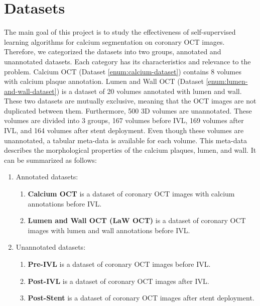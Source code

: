 \documentclass[a4paper,11pt,oneside]{report}
\begin{document}

\section{Datasets}\label{sec:design:datasets}
The main goal of this project is to study the effectiveness of self-supervised learning algorithms for calcium segmentation on coronary OCT images. Therefore, we categorized the datasets into two groups, annotated and unannotated datasets. Each category has its characteristics and relevance to the problem. Calcium OCT (Dataset \ref{enum:calcium-dataset}) contains 8 volumes with calcium plaque annotation. Lumen and Wall OCT (Dataset \ref{enum:lumen-and-wall-dataset}) is a dataset of 20 volumes annotated with lumen and wall. These two datasets are mutually exclusive, meaning that the OCT images are not duplicated between them. Furthermore, 500 3D volumes are unannotated. These volumes are divided into 3 groups, 167 volumes before IVL, 169 volumes after IVL, and 164 volumes after stent deployment. Even though these volumes are unannotated, a tabular meta-data is available for each volume. This meta-data describes the morphological properties of the calcium plaques, lumen, and wall. It can be summarized as follows:

\begin{enumerate}
    \item Annotated datasets:
    \begin{enumerate}
        \item \label{enum:calcium-dataset} \textbf{Calcium OCT} is a dataset of coronary OCT images with calcium annotations before IVL.
        \item \label{enum:lumen-and-wall-dataset} \textbf{Lumen and Wall OCT (LaW OCT)} is a dataset of coronary OCT images with lumen and wall annotations before IVL.
    \end{enumerate}
    \item \label{enum:unannotated-dataset} Unannotated datasets:
    \begin{enumerate}
        \item \textbf{Pre-IVL} is a dataset of coronary OCT images before IVL.
        \item \textbf{Post-IVL} is a dataset of coronary OCT images after IVL.
        \item \textbf{Post-Stent} is a dataset of coronary OCT images after stent deployment.
    \end{enumerate}
\end{enumerate}
\end{document}
